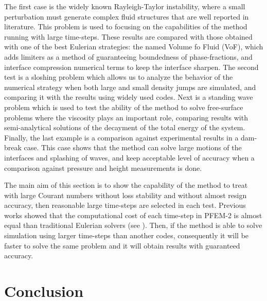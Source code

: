 \documentclass[review]{elsarticle}
\begin{document}
The first case is the widely known Rayleigh-Taylor instability, where a small perturbation must generate complex fluid structures that are well reported in literature.
This problem is used to focusing on the capabilities of the method running with large time-steps. These results are compared with those obtained with one of the best Eulerian strategies: the named Volume fo Fluid (VoF), which adds limiters as a method of guaranteeing boundedness of phase-fractions, and interface compression numerical terms to keep the interface sharpen.
The second test is a sloshing problem which allows us to analyze the behavior of the numerical strategy when both large and small density jumps are simulated, and comparing it with the results using widely used codes. Next is a standing wave problem which is used to test the ability of the method to solve free-surface problems where the viscosity plays an important role, comparing results with semi-analytical solutions of the decayment of the total energy of the system.
Finally, the last example is a comparison against experimental results in a dam-break case.
This case shows that the method can solve large motions of the interfaces and splashing of waves, and keep acceptable level of accuracy when a comparison against pressure and height measurements is done.

The main aim of this section is to show the capability of the method to treat with large Courant numbers without loss stability and without almost resign accuracy, then reasonable large time-steps are selected in each test. Previous works showed that the computational cost of each time-step in PFEM-2 is almost equal than traditional Eulerian solvers (see \cite{Idelsohn12b}\cite{Gimenez14}). Then, if the method is able to solve simulation using larger time-steps than another codes, consequently it will be faster to solve the same problem and it will obtain results with guaranteed accuracy.





% 


\section{Conclusion}
\end{document}
